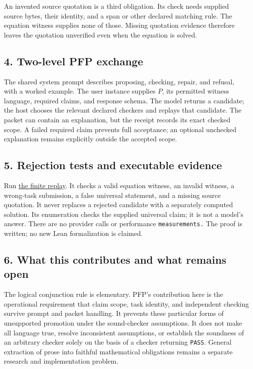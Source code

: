 \documentclass[
  11pt,
]{article}
\newcommand{\passthrough}[1]{#1}
\begin{document}
An invented source quotation is a third obligation. Its check needs
supplied source bytes, their identity, and a span or other declared
matching rule. The equation witness supplies none of those. Missing
quotation evidence therefore leaves the quotation unverified even when
the equation is solved.

\subsection{4. Two-level PFP exchange}\label{two-level-pfp-exchange}

The shared system prompt describes proposing, checking, repair, and
refusal, with a worked example. The user instance supplies \(P\), its
permitted witness language, required claims, and response schema. The
model returns a candidate; the host chooses the relevant declared
checkers and replays that candidate. The packet can contain an
explanation, but the receipt records its exact checked scope. A failed
required claim prevents full acceptance; an optional unchecked
explanation remains explicitly outside the accepted scope.

\subsection{5. Rejection tests and executable
evidence}\label{rejection-tests-and-executable-evidence}

Run \href{code/replay.py}{the finite replay}. It checks a valid equation
witness, an invalid witness, a wrong-task submission, a false universal
statement, and a missing source quotation. It never replaces a rejected
candidate with a separately computed solution. Its enumeration checks
the supplied universal claim; it is not a model's answer. There are no
provider calls or performance \nolinkurl{measurements.} The proof is
written; no new Lean formalization is claimed.

\subsection{6. What this contributes and what remains
open}\label{what-this-contributes-and-what-remains-open}

The logical conjunction rule is elementary. PFP's contribution here is
the operational requirement that claim scope, task identity, and
independent checking survive prompt and packet handling. It prevents
these particular forms of unsupported promotion under the sound-checker
assumptions. It does not make all language true, resolve inconsistent
assumptions, or establish the soundness of an arbitrary checker solely
on the basis of a checker returning \passthrough{\lstinline!PASS!}.
General extraction of prose into faithful mathematical obligations
remains a separate research and implementation problem.
\end{document}
